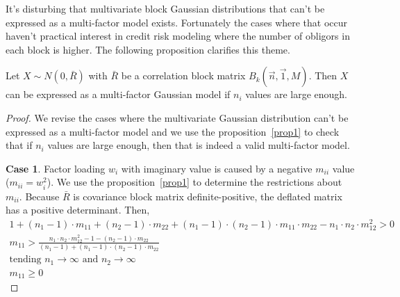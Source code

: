 \documentclass[11pt,fleqn]{book} %
\begin{document}
It's disturbing that multivariate block Gaussian distributions 
that can't be expressed as a multi-factor model exists. Fortunately the 
cases where that occur haven't practical interest in credit risk
modeling where the number of obligors in each block is higher. 
The following proposition clarifies this theme.

\begin{proposition}
	\label{prop:gmfamgb}
	Let $X \sim N(0,\bar{R})$ with $\bar{R}$ be a correlation block matrix 
	$B_k(\vec{n},\vec{1},M)$. Then $X$ can be expressed as a multi-factor 
	Gaussian model if $n_i$ values are large enough.
\end{proposition}
\begin{proof}
	We revise the cases where the multivariate Gaussian distribution can't
	be expressed as a multi-factor model and we use the proposition~\ref{prop1}
	to check that if $n_i$ values are large enough, then 
	that is indeed a valid multi-factor model.
	
	\textbf{Case 1}. Factor loading $w_i$ with imaginary value is caused by 
	a negative $m_{ii}$ value ($m_{ii} = w_i^2$). We use the 
	proposition~\ref{prop1} to determine the restrictions about $m_{ii}$. 
	Because $\bar{R}$ is covariance block matrix definite-positive, the 
	deflated matrix has a positive determinant. Then,
	\begin{displaymath}
		\begin{array}{l}
			1 + (n_1-1) \cdot m_{11} + (n_2-1) \cdot m_{22} +                     
			(n_1-1) \cdot (n_2-1) \cdot m_{11} \cdot m_{22} -                     
			n_1 \cdot n_2 \cdot m_{12}^2 > 0                                      
			                                                                      \\
			m_{11} > \frac{n_1 \cdot n_2 \cdot m_{12}^2 -1 -(n_2-1) \cdot m_{22}} 
			{(n_1-1) + (n_1-1) \cdot (n_2-1) \cdot m_{22}}                        
			                                                                      \\
			\text{tending } n_1 \to \infty \text{ and } n_2 \to \infty
			                                                                      \\
			m_{11} \ge 0                                                          
		\end{array}
	\end{displaymath}
	

\end{proof}
\end{document}
